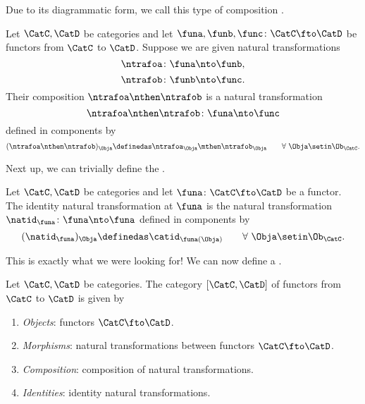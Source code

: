 Due to its diagrammatic form, we call this type of composition .
\begin{ctdefinition}\label{def:composition-of-naturali-tranformations}
    Let $\CatC, \CatD$ be categories and let $\funa, \funb, \func \colon \CatC \fto \CatD$ be functors from $\CatC$ to $\CatD$.
    Suppose we are given natural transformations
    \begin{equation}
        \ntrafoa \colon \funa \nto \funb,
    \end{equation}
    \begin{equation}
        \ntrafob \colon \funb \nto \func.
    \end{equation}
    Their composition $\ntrafoa \nthen \ntrafob$ is a natural transformation
    \begin{equation}
        \ntrafoa \nthen \ntrafob \colon \funa \nto \func
    \end{equation}
    defined in components by
    \begin{equation}\label{eq:nat-trafo-composition}
        (\ntrafoa \nthen \ntrafob)_\Obja \definedas \ntrafoa_\Obja \mthen \ntrafob_\Obja \quad \quad \forall \ \Obja \setin \Ob_\CatC.
    \end{equation}
\end{ctdefinition}
Next up, we can trivially define the .

\begin{ctdefinition}\label{def:identity-natural-transformation}
    Let $\CatC, \CatD$ be categories and let $\funa \colon \CatC \fto \CatD$ be a functor.
    The identity natural transformation at $\funa$ is the natural transformation $\natid_\funa \colon \funa \nto \funa$ defined in components by
    \begin{equation}\label{eq:identity-nat-trafo-def}
        (\natid_\funa)_\Obja \definedas \catid_{\funa(\Obja)} \quad \quad \forall \ \Obja \setin\Ob_\CatC.
    \end{equation}
\end{ctdefinition}

This is exactly what we were looking for! We can now define a .

\begin{ctdefinition}\label{def:category-of-functors}
    Let $\CatC, \CatD$ be categories.
    The category $[\CatC, \CatD]$ of functors from $\CatC$ to $\CatD$ is given by
    \begin{enumerate}
        \item \emph{Objects}: functors $\CatC \fto \CatD$.
        \item \emph{Morphisms}: natural transformations between functors $\CatC \fto \CatD$.
        \item \emph{Composition}: composition of natural transformations.
        \item \emph{Identities}: identity natural transformations.
    \end{enumerate}
\end{ctdefinition}

